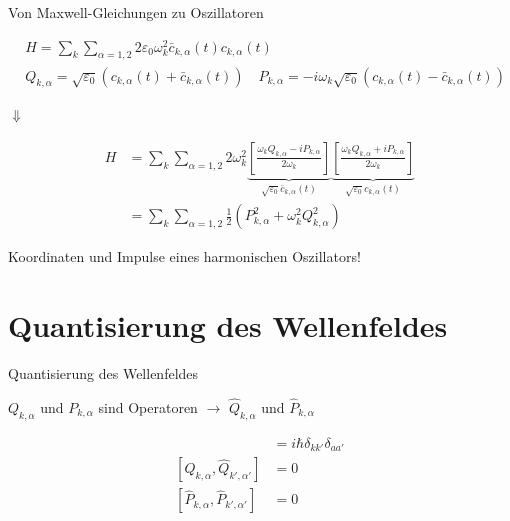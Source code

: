 \documentclass{beamer}
\begin{document}
\begin{frame}[t]{Von Maxwell-Gleichungen zu Oszillatoren}
	\vspace*{-0.5cm}
	\begin{center}
		\begin{minipage}{0.35\textwidth}
			\begin{align*}
			& H = \sum_k \sum_{\alpha=1,2} 2 \varepsilon_0 \omega_k^2 \bar{c}_{k,\alpha}(t) c_{k,\alpha}(t) \\
			& Q_{k,\alpha} = \sqrt{\varepsilon_0} \left(c_{k,\alpha}(t) + \bar{c}_{k,\alpha}(t)\right) \quad P_{k,\alpha} = -i \omega_k \sqrt{\varepsilon_0} \left(c_{k,\alpha}(t) - \bar{c}_{k,\alpha}(t)\right) 
			\end{align*}
		\end{minipage}
		
		\vspace*{0.5cm}
		$\Downarrow$
		
		\begin{minipage}{0.35\textwidth}
			\begin{align*}
			H &= \sum_k \sum_{\alpha=1,2} 2 \omega_k^2 
			\underbrace{\left[ \frac{\omega_k Q_{k,\alpha} - i P_{k,\alpha}}{2 \omega_k} \right]}_{\sqrt{\varepsilon_0} \bar{c}_{k,\alpha}(t)}
			\underbrace{\left[ \frac{\omega_k Q_{k,\alpha} + i P_{k,\alpha}}{2 \omega_k} \right]}_{\sqrt{\varepsilon_0} c_{k,\alpha}(t)} \\
			&= \sum_k \sum_{\alpha=1,2} \frac{1}{2} \left(P_{k,\alpha}^2 + \omega_k^2 Q_{k,\alpha}^2\right)
			\end{align*}
		\end{minipage}
		
		Koordinaten und Impulse eines harmonischen Oszillators!
	\end{center}
\end{frame}


\section{Quantisierung des Wellenfeldes}
\begin{frame}[t]{Quantisierung des Wellenfeldes}
	\vspace*{-0.5cm}
	\begin{center}
		$Q_{k,\alpha}$ und $P_{k,\alpha}$ sind Operatoren $\rightarrow$ $\hat{Q}_{k,\alpha}$ und $\hat{P}_{k,\alpha}$
		
		\begin{minipage}{0.35\textwidth}
			\begin{align*}
			[\hat{Q}_{k,\alpha}, \hat{P}_{k',\alpha'}] &= i \hbar \delta_{kk'}\delta_{aa'} \\
			[\hat{Q}_{k,\alpha}, \hat{Q}_{k',\alpha'}] &= 0 \\
			[\hat{P}_{k,\alpha}, \hat{P}_{k',\alpha'}] &= 0
			\end{align*}
		\end{minipage}
	\end{center}
\end{frame}
\end{document}
